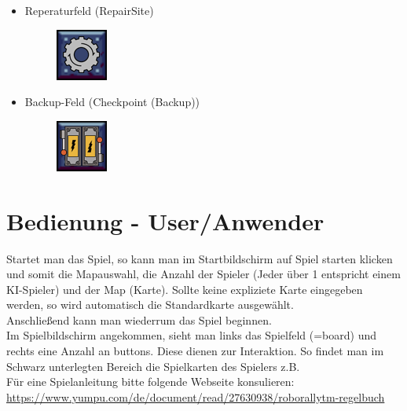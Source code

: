 \documentclass[12pt,a4paper,oneside]{book}
\theoremstyle{plain}
\numberwithin{equation}{chapter} \DeclareMathOperator{\Var}{Var}
\begin{document}
\begin{itemize}
    \newpage
    \item Reperaturfeld (RepairSite)
    \begin{itemize}
        \begin{figure}[h]
            \centering
            \includegraphics{assets/Gear/Gear01.png}
            \label{ConveyorBelt}
        \end{figure}
    \end{itemize}
    
    \item Backup-Feld (Checkpoint (Backup))
    \begin{itemize}
        \begin{figure}[h]
            \centering
            \includegraphics{assets/Checkpoint.png}
            \label{ConveyorBelt}
        \end{figure}
    \end{itemize}
    
\end{itemize}

\chapter{Bedienung - User/Anwender}

    Startet man das Spiel, so kann man im Startbildschirm auf Spiel starten klicken und somit die Mapauswahl, die Anzahl der Spieler (Jeder über 1 entspricht einem KI-Spieler) und der Map (Karte). Sollte keine expliziete Karte eingegeben werden, so wird automatisch die Standardkarte ausgewählt. \\
    Anschließend kann man wiederrum das Spiel beginnen.\\
    Im Spielbildschirm angekommen, sieht man links das Spielfeld (=board) und rechts eine Anzahl an buttons. Diese dienen zur Interaktion. So findet man im Schwarz unterlegten Bereich die Spielkarten des Spielers z.B.\\
    Für eine Spielanleitung bitte folgende Webseite konsulieren: \\
    \hypertarget{https://www.yumpu.com/de/document/read/27630938/roborallytm-regelbuch}{\url{https://www.yumpu.com/de/document/read/27630938/roborallytm-regelbuch}}
\end{document}
